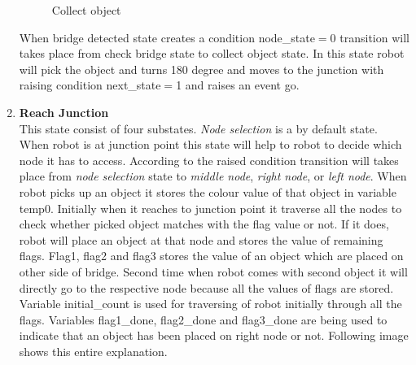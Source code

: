\documentclass[a4paper,12pt,oneside]{article}
\begin{document}
\begin{enumerate}
\begin{figure}[H]
\caption{Collect object}
\end{figure}
When bridge detected state creates a condition {node\_state$=$0} transition will takes place from check bridge state to collect object state. In this state robot will pick the object and turns 180 degree and moves to the junction with raising condition {next\_state$=$1} and raises an event go.\\

\item \textbf{Reach Junction}\\

This state consist of four substates. \emph{Node selection} is a by default state. When robot is at junction point this state will help to robot to decide which node it has to access. According to the raised condition transition will takes place from \emph{node selection} state to \emph{middle node}, \emph{right node}, or \emph{left node}. When robot picks up an object it stores the colour value of that object in variable temp0. Initially when it reaches to junction point it traverse all the nodes to check whether picked object matches with the flag value or not. If it does, robot will place an object at that node and stores the value of remaining flags. Flag1, flag2 and flag3 stores the value of an object which are placed on other side of bridge. Second time when robot comes with second object it will directly go to the respective node because all the values of flags are stored. Variable {initial\_count} is used for traversing of robot initially through all the flags. Variables {flag1\_done}, {flag2\_done} and {flag3\_done} are being used to indicate that an object has been placed on right node or not. Following image shows this entire explanation. \\
\newpage
\begin{figure}[H]
\centering

\end{figure}
\end{enumerate}
\end{document}
